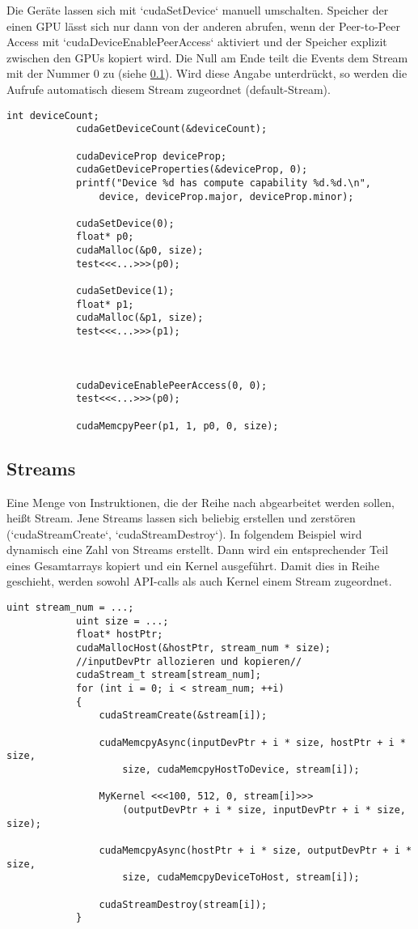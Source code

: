		Die Geräte lassen sich mit \li`cudaSetDevice` manuell umschalten. Speicher der einen GPU lässt sich nur dann von der anderen abrufen, wenn der Peer-to-Peer Access mit \li`cudaDeviceEnablePeerAccess` aktiviert und der Speicher explizit zwischen den GPUs kopiert wird. Die Null am Ende teilt die Events dem Stream mit der Nummer 0 zu (siehe \ref{streams}). Wird diese Angabe unterdrückt, so werden die Aufrufe automatisch diesem \Gls{Stream} zugeordnet (default-\Gls{Stream}).
		\begin{lstlisting}[caption=Device Peer-to-Peer Access]
			int deviceCount;
			cudaGetDeviceCount(&deviceCount);

			cudaDeviceProp deviceProp;
			cudaGetDeviceProperties(&deviceProp, 0);
			printf("Device %d has compute capability %d.%d.\n",
    			device, deviceProp.major, deviceProp.minor);
           
			cudaSetDevice(0);
			float* p0;
			cudaMalloc(&p0, size);
			test<<<...>>>(p0);
			
			cudaSetDevice(1);
			float* p1;
			cudaMalloc(&p1, size);
			test<<<...>>>(p1);
			
			
			
			cudaDeviceEnablePeerAccess(0, 0);
			test<<<...>>>(p0);
			
			cudaMemcpyPeer(p1, 1, p0, 0, size);
		\end{lstlisting}

	
		\subsection{Streams}\label{streams}
		Eine Menge von Instruktionen, die der Reihe nach abgearbeitet werden sollen, heißt \Gls{Stream}. Jene \Glspl{Stream} lassen sich beliebig erstellen und zerstören (\li`cudaStreamCreate`, \li`cudaStreamDestroy`). In folgendem Beispiel wird dynamisch eine Zahl von \Glspl{Stream} erstellt. Dann wird ein entsprechender Teil eines Gesamtarrays kopiert und ein Kernel ausgeführt. Damit dies in Reihe geschieht, werden sowohl \Gls{API}-calls als auch \Gls{Kernel} einem \Gls{Stream} zugeordnet.	
		
		\newpage
		
		\begin{lstlisting}[caption=Streams]
			uint stream_num = ...;
			uint size = ...;	    
			float* hostPtr;
			cudaMallocHost(&hostPtr, stream_num * size);	
			//inputDevPtr allozieren und kopieren//
			cudaStream_t stream[stream_num];
			for (int i = 0; i < stream_num; ++i)
			{
				cudaStreamCreate(&stream[i]);
    			
				cudaMemcpyAsync(inputDevPtr + i * size, hostPtr + i * size,
					size, cudaMemcpyHostToDevice, stream[i]);
    			
				MyKernel <<<100, 512, 0, stream[i]>>>
					(outputDevPtr + i * size, inputDevPtr + i * size, size);
				
				cudaMemcpyAsync(hostPtr + i * size, outputDevPtr + i * size,
					size, cudaMemcpyDeviceToHost, stream[i]);
								
				cudaStreamDestroy(stream[i]);
			}
		\end{lstlisting}

